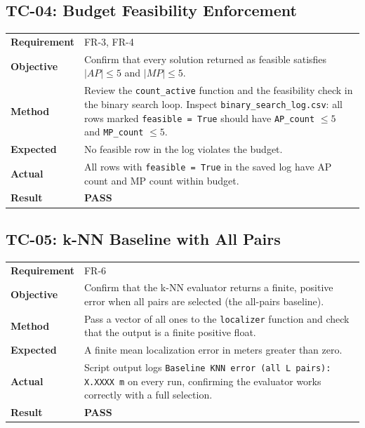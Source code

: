 \documentclass[12pt,a4paper]{article}
\newcommand{\pass}{\textcolor{green!50!black}{\textbf{PASS}}}
\begin{document}
\subsection{TC-04: Budget Feasibility Enforcement}

\begin{table}[h!]
\renewcommand{\arraystretch}{1.3}
\begin{tabular}{@{}lp{10cm}@{}}
\toprule
\textbf{Requirement} & FR-3, FR-4 \\
\textbf{Objective} & Confirm that every solution returned as feasible
    satisfies $|AP| \leq 5$ and $|MP| \leq 5$. \\
\textbf{Method} & Review the \texttt{count\_active} function and the
    feasibility check in the binary search loop. Inspect
    \texttt{binary\_search\_log.csv}: all rows marked
    \texttt{feasible = True} should have \texttt{AP\_count} $\leq 5$
    and \texttt{MP\_count} $\leq 5$. \\
\textbf{Expected} & No feasible row in the log violates the budget. \\
\textbf{Actual} & All rows with \texttt{feasible = True} in the saved
    log have AP count and MP count within budget. \\
\textbf{Result} & \pass \\
\bottomrule
\end{tabular}
\end{table}

\subsection{TC-05: k-NN Baseline with All Pairs}

\begin{table}[h!]
\renewcommand{\arraystretch}{1.3}
\begin{tabular}{@{}lp{10cm}@{}}
\toprule
\textbf{Requirement} & FR-6 \\
\textbf{Objective} & Confirm that the k-NN evaluator returns a finite,
    positive error when all pairs are selected (the all-pairs baseline). \\
\textbf{Method} & Pass a vector of all ones to the \texttt{localizer}
    function and check that the output is a finite positive float. \\
\textbf{Expected} & A finite mean localization error in meters greater
    than zero. \\
\textbf{Actual} & Script output logs \texttt{Baseline KNN error (all L
    pairs): X.XXXX m} on every run, confirming the evaluator works
    correctly with a full selection. \\
\textbf{Result} & \pass \\
\bottomrule
\end{tabular}
\end{table}
\end{document}
